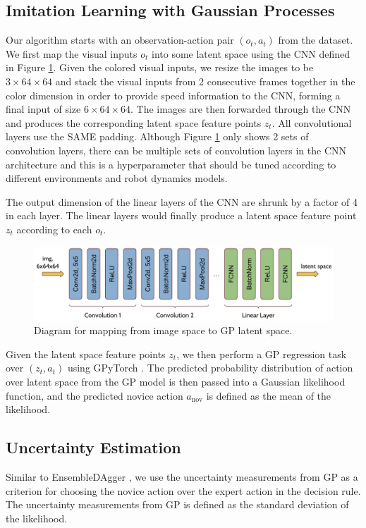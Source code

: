 \documentclass[11pt, reqno, letterpaper, twoside]{amsart}
\begin{document}
\subsection{Imitation Learning with Gaussian Processes}
Our algorithm starts with an observation-action pair $(o_t, a_t)$ from the
dataset. We first map the visual inputs $o_t$ into some latent space using the
CNN defined in Figure \ref{fig:conv_diagram}. Given the colored visual inputs,
we resize the images to be $3\times 64\times 64$ and stack the visual inputs
from 2 consecutive frames together in the color dimension in order to provide
speed information to the CNN, forming a final input of size $6\times 64\times
	64$. The images are then forwarded through the CNN and produces the
corresponding latent space feature points $z_t$. All convolutional layers use
the SAME padding. Although Figure \ref{fig:conv_diagram} only shows 2 sets of
convolution layers, there can be multiple sets of convolution layers in the CNN
architecture and this is a hyperparameter that should be tuned according to
different environments and robot dynamics models.

The output dimension of the linear layers of the CNN are shrunk by a factor of 4
in each layer. The linear layers would finally produce a latent space feature
point $z_t$ according to each $o_t$.

\begin{figure}[htbp!]
	\centering
	\includegraphics[width=\linewidth]{imgs/conv_diagram.png}
	\caption{Diagram for mapping from image space to GP latent space.}
	\label{fig:conv_diagram}
\end{figure}

Given the latent space feature points $z_t$, we then perform a GP regression
task over $(z_t,a_t)$ using GPyTorch \cite{GPyTorch}. The predicted probability
distribution of action over latent space from the GP model is then passed into a
Gaussian likelihood function, and the predicted novice action $a_\text{nov}$ is
defined as the mean of the likelihood.

\subsection{Uncertainty Estimation}
Similar to EnsembleDAgger \cite{ensemble-dagger}, we use the uncertainty
measurements from GP as a criterion for choosing the novice action over the
expert action in the decision rule. The uncertainty measurements from GP is
defined as the standard deviation of the likelihood.
\end{document}
